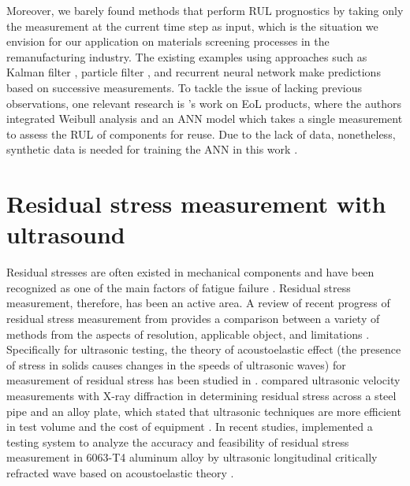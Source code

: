  Moreover, we barely found methods that perform RUL prognostics by taking only the measurement at the current time step as input, which is the situation we envision for our application on materials screening processes in the remanufacturing industry. The existing examples using approaches such as Kalman filter \cite{rul-statespace-fatigue-RAY1996}, particle filter \cite{rul-statespace-fatigue-8819426}, and recurrent neural network \cite{rul-rnn-turbo-WU2020241} make predictions based on successive measurements. To tackle the issue of lacking previous observations, one relevant research is 's work on EoL products, where the authors integrated Weibull analysis and an ANN model which takes a single measurement to assess the RUL of components for reuse. Due to the lack of data, nonetheless, synthetic data is needed for training the ANN in this work \cite{rul-nn-eol-MAZHAR20071184}.


\section{Residual stress measurement with ultrasound}
Residual stresses are often existed in mechanical components and have been recognized as one of the main factors of fatigue failure \cite{rs-fatigue-WEBSTER2001375}. Residual stress measurement, therefore, has been an active area. A review of recent progress of residual stress measurement from  provides a comparison between a variety of methods from the aspects of resolution, applicable object, and limitations \cite{nde-rs-review-GUO202154}. Specifically for ultrasonic testing, the theory of acoustoelastic effect (the presence of stress in solids causes changes in the speeds of ultrasonic waves) for measurement of residual stress has been studied in \cite{nde-lu-rs-Man1987}.  compared ultrasonic velocity measurements with X-ray diffraction in determining residual stress across a steel pipe and an alloy plate, which stated that ultrasonic techniques are more efficient in test volume and the cost of equipment \cite{nde-lu-rs-TANALA199583}. In recent studies,  implemented a testing system to analyze the accuracy and feasibility of residual stress measurement in 6063-T4 aluminum alloy by ultrasonic longitudinal critically refracted wave based on acoustoelastic theory \cite{nde-lu-rs-LIU2018178}.

